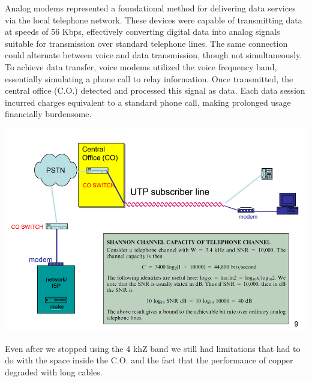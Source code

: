 \documentclass[11pt, a4paper]{article}
\begin{document}
Analog modems represented a foundational method for delivering data services via the local
telephone network. These devices were capable of transmitting data at speeds of 56 Kbps,
effectively converting digital data into analog signals suitable for transmission over standard
telephone lines. The same connection could alternate between voice and data transmission,
though not simultaneously.
To achieve data transfer, voice modems utilized the voice frequency band, essentially
simulating a phone call to relay information. Once transmitted, the central office (C.O.) detected
and processed this signal as data. Each data session incurred charges equivalent to a standard
phone call, making prolonged usage financially burdensome.
\begin{center}
    \includegraphics[scale=0.5]{img/AccessNetworks/XDSL/Shannon.png}
\end{center}
Even after we stopped using the 4 khZ band we still had limitations that had to do with the space inside the C.O. and the fact that the performance of copper degraded with long cables.\\
\end{document}
